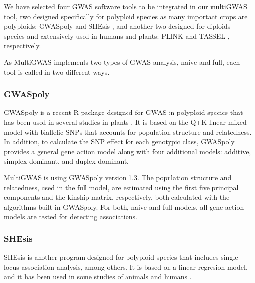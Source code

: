 \documentclass{article}
\begin{document}
We have selected four GWAS software tools to be integrated in our multiGWAS tool, two designed specifically for polyploid species as many important crops are polyploids: GWASpoly \cite{Rosyara2016} and SHEsis \cite{Yong2006}, and another two designed for diploids species and extensively used in humans and plants: PLINK \cite{Purcell2007,Chang2015} and TASSEL \cite{Bradbury2007}, respectively. 

As MultiGWAS implements two types of GWAS analysis, naive and full, each tool is called in two different ways. %

\subsubsection{GWASpoly}

GWASpoly is a recent R package designed for GWAS in polyploid species that has been used in several studies in plants \cite{Berdugo2017,Ferrao2018,Sharma2018,Yuan2019}. It is based on the Q+K linear mixed model with biallelic SNPs that accounts for population structure and relatedness. In addition, to calculate the SNP effect for each genotypic class, GWASpoly provides a general gene action model along with four additional models: additive, simplex dominant, and duplex dominant. 

MultiGWAS is using GWASpoly version 1.3. The population structure and relatedness, used in the full model, are estimated using the first five principal components and the kinship matrix, respectively, both calculated with the algorithms built in GWASpoly. For both, naive and full models, all gene action models are tested for detecting associations.


\subsubsection{SHEsis}

SHEsis is another program designed for polyploid species that includes single locus association analysis, among others. It is based on a linear regresion model, and it has been used in some studies of animals and humans \cite{Qiao2015,Meng2019}. 
\end{document}
